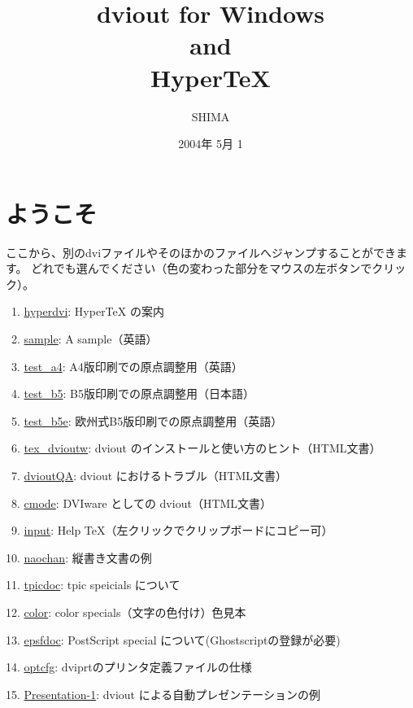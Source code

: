 \title{dviout for Windows\\
       and\\
       Hyper\TeX}
\author{SHIMA}
\date{2004年 5月 1}

\maketitle
\section{ようこそ}
ここから、別のdviファイルやそのほかのファイルへジャンプすることができます。
どれでも選んでください（色の変わった部分をマウスの左ボタンでクリック）。

\ 1. \href{file:hyperdvi.dvi#jump}{hyperdvi}: HyperTeX の案内

\ 2. \href{file:..\sample\sample.dvi}{sample}: A sample（英語）

\ 3. \href{file:..\test_a4.dvi}{test\_a4}: A4版印刷での原点調整用（英語）

\ 4. \href{file:..\test_b5.dvi}{test\_b5}: B5版印刷での原点調整用（日本語）

\ 5. \href{file:..\test_b5e.dvi}{test\_b5e}: 欧州式B5版印刷での原点調整用（英語）

\ 6. \href{file:..\DOC\tex_dvioutw.html}{tex\_dvioutw}: dviout のインストールと使い方のヒント（HTML文書）

\ 7. \href{file:..\DOC\dvioutQA.html}{dvioutQA}: dviout におけるトラブル（HTML文書）

\ 8. \href{file:..\DOC\cmode.html}{cmode}: DVIware としての dviout（HTML文書）

\ 9. \href{file:input.dvi}{input}: Help TeX（左クリックでクリップボードにコピー可）

10. \href{file:..\ptex\naochan!.dvi}{naochan}: 縦書き文書の例

11. \href{file:..\graphic\tpic\tpicdoc.dvi}{tpicdoc}: tpic speicials について

12. \href{file:..\graphic\color\color.dvi}{color}: color specials（文字の色付け）色見本

13. \href{file:..\graphic\ps\epsfdoc.dvi}{epsfdoc}: PostScript special について(Ghostscriptの登録が必要)

14. \href{file:..\cfg\optcfg.dvi}{optcfg}: dviprtのプリンタ定義ファイルの仕様

15. \href{file:..\sample\slisampl.dvi}{Presentation-1}: dviout による自動プレゼンテーションの例

